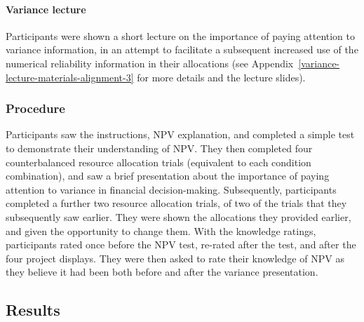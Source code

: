 \documentclass[a4paper, nobind, dvipsnames]{templates/ociamthesis}
\theoremstyle{definition}
\theoremstyle{definition}
\theoremstyle{definition}
\theoremstyle{definition}
\theoremstyle{remark}
\begin{document}
\paragraph{Variance lecture}

Participants were shown a short lecture on the importance of paying attention to
variance information, in an attempt to facilitate a subsequent increased use of
the numerical reliability information in their allocations (see
Appendix~\ref{variance-lecture-materials-alignment-3} for more details and the
lecture slides).

\hypertarget{procedure-alignment-3}{%
\subsubsection{Procedure}\label{procedure-alignment-3}}

Participants saw the instructions, NPV explanation, and completed a simple test
to demonstrate their understanding of NPV. They then completed four
counterbalanced resource allocation trials (equivalent to each condition
combination), and saw a brief presentation about the importance of paying
attention to variance in financial decision-making. Subsequently, participants
completed a further two resource allocation trials, of two of the trials that
they subsequently saw earlier. They were shown the allocations they provided
earlier, and given the opportunity to change them. With the knowledge ratings,
participants rated once before the NPV test, re-rated after the test, and after
the four project displays. They were then asked to rate their knowledge of NPV
as they believe it had been both before and after the variance presentation.

\subsection{Results}
\end{document}
